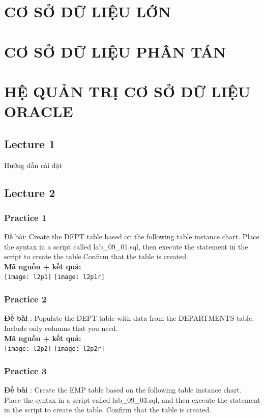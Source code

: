 \documentclass[a4paper]{report}
\begin{document}
\tableofcontents


\chapter{CƠ SỞ DỮ LIỆU LỚN}

\chapter{CƠ SỞ DỮ LIỆU PHÂN TÁN}

\chapter{HỆ QUẢN TRỊ CƠ SỞ DỮ LIỆU ORACLE}

\section{Lecture 1}
Hướng dẫn cài đặt

\section{Lecture 2}

\subsection{Practice 1}
\noindent
Đề bài: Create the DEPT table based on the following table instance chart. Place the syntax in a script called lab\_09\_01.sql, then execute the statement in the script to create the table.Confirm that the table is created.\\

\textbf{Mã nguồn + kết quả: }\\
\texttt{[image: l2p1]}
\texttt{[image: l2p1r]}


\subsection{Practice 2}
\noindent
\textbf{Đề bài} : Populate the DEPT table with data from the DEPARTMENTS table. Include only columns that you need.\\

\textbf{Mã nguồn + kết quả: }\\
\texttt{[image: l2p2]}
\texttt{[image: l2p2r]}

\subsection{Practice 3}
\noindent
\textbf{Đề bài} : Create the EMP table based on the following table instance chart. Place the syntax in a script called lab\_09\_03.sql, and then execute the statement in the script to create the table. Confirm that the table is created.\\
\end{document}
